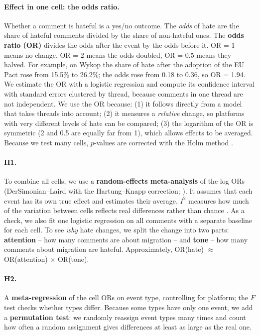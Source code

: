 \documentclass[11pt]{article}
\begin{document}
\paragraph{Effect in one cell: the odds ratio.} Whether a comment is hateful is a yes/no outcome. The \emph{odds} of hate are the share of hateful comments divided by the share of non-hateful ones. The \textbf{odds ratio (OR)} divides the odds after the event by the odds before it. OR = 1 means no change, OR = 2 means the odds doubled, OR = 0.5 means they halved. For example, on Wykop the share of hate after the adoption of the EU Pact rose from 15.5\% to 26.2\%; the odds rose from 0.18 to 0.36, so OR = 1.94. We estimate the OR with a logistic regression and compute its confidence interval with standard errors clustered by thread, because comments in one thread are not independent. We use the OR because: (1) it follows directly from a model that takes threads into account; (2) it measures a \emph{relative} change, so platforms with very different levels of hate can be compared; (3) the logarithm of the OR is symmetric (2 and 0.5 are equally far from 1), which allows effects to be averaged. Because we test many cells, $p$-values are corrected with the Holm method \citep{holm1979}.

\paragraph{H1.} To combine all cells, we use a \textbf{random-effects meta-analysis} of the log ORs (DerSimonian--Laird with the Hartung--Knapp correction; \citealp{dersimonian1986,hartung2001}). It assumes that each event has its own true effect and estimates their average. $I^2$ measures how much of the variation between cells reflects real differences rather than chance \citep{higgins2002}. As a check, we also fit one logistic regression on all comments with a separate baseline for each cell. To see \emph{why} hate changes, we split the change into two parts: \textbf{attention} -- how many comments are about migration -- and \textbf{tone} -- how many comments about migration are hateful. Approximately, OR(hate) $\approx$ OR(attention) $\times$ OR(tone).

\paragraph{H2.} A \textbf{meta-regression} of the cell ORs on event type, controlling for platform; the $F$ test checks whether types differ. Because some types have only one event, we add a \textbf{permutation test}: we randomly reassign event types many times and count how often a random assignment gives differences at least as large as the real one.
\end{document}

